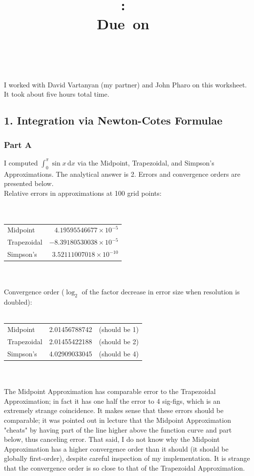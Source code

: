 \documentclass{article}
\title{\vspace{2in}\textmd{\textbf{\hmwkClass:\ \hmwkTitle}}\\\normalsize\vspace{0.1in}\small{Due\ on\ \hmwkDueDate}\\\vspace{0.1in}\large{\textit{\hmwkClassInstructor\ \hmwkClassTime}}\vspace{3in}}
\date{}
\author{\textbf{\hmwkAuthorName}}
\newcommand{\inte}[4]{\int_{#1}^{#2} \! #3 \, \mathrm{d} #4}
\newcommand{\ee}[1]{\times 10^{#1}}
\begin{document}
\begin{spacing}{1.1}

\newpage


I worked with David Vartanyan (my partner) and John Pharo on this worksheet. It took about five hours total time.

\subsection{1. Integration via Newton-Cotes Formulae }

\subsubsection{Part A}

I computed \(\inte{0}{\pi}{\sin x}{x}\) via the Midpoint, Trapezoidal, and Simpson's Approximations. The analytical answer is 2. Errors and convergence orders are presented below. \\

\noindent Relative errors in approximations at 100 grid points: \\ \\
    \begin{tabular}{lr}
	Midpoint & \(4.19595546677\ee{-5}\) \\
	Trapezoidal &	 \(-8.39180530038\ee{-5} \)\\
	Simpson's &	 \(3.52111007018\ee{-10}\)\\

	\end{tabular} \\ \\

\noindent Convergence order (\(\log_2\) of the factor decrease in error size when resolution is doubled): \\ \\
\begin{tabular}{lrr}
Midpoint 	& 2.01456788742 & (should be 1) \\
Trapezoidal &	 2.01455422188 & (should be 2) \\
Simpson's 	& 4.02909033045 & (should be 4) \\
\end{tabular} \\ \\

The Midpoint Approximation has comparable error to the Trapezoidal Approximation; in fact it has one half the error to 4 sig-figs, which is an extremely strange coincidence. It makes sense that these errors should be comparable; it was pointed out in lecture that the Midpoint Approximation "cheats" by having part of the line higher above the function curve and part below, thus canceling error. That said, I do not know why the Midpoint Approximation has a higher convergence order than it should (it should be globally first-order), despite careful inspection of my implementation. It is strange that the convergence order is so close to that of the Trapezoidal Approximation.


\end{spacing}
\end{document}
